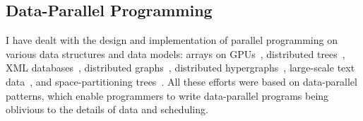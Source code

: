 \documentclass[a4paper,dvipdfmx]{article}
\begin{document}
\subsection{Data-Parallel Programming}
I have dealt with the design and implementation of parallel programming
on various data structures and data models: arrays on
GPUs~\cite{aplas09:gpu_skel}, distributed trees~\cite{ijpp16:tree_skel},
XML databases~\cite{adbis18:par_xpath,cloudcomp20:xpath}, distributed
graphs~\cite{fhpc16:s6raph,ngc18:pregel}, distributed
hypergraphs~\cite{jip21:hyper_gemini}, large-scale text
data~\cite{ipdps21:plex,jip20:centaurus}, and space-partitioning
trees~\cite{ispass22:vipp}.  All these efforts were based on
data-parallel patterns, which enable programmers to write data-parallel
programs being oblivious to the details of data and scheduling.
\end{document}
